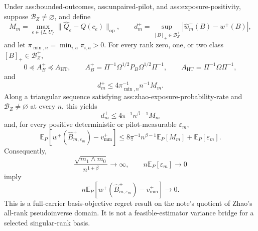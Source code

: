 Under ass:bounded-outcomes, ass:unpaired-pilot, and ass:exposure-positivity, suppose \(\mathcal B_Z\ne\varnothing\), and define
\[
 M_m=\max_{e\in\{L,U\}}\lVert\widehat Q_e-Q(c_e)\rVert_{\mathrm{op}},
 \qquad
 d_m^+=\sup_{[B]_+\in\mathcal B_Z^+}
 |\widehat w_m^+(B)-w^+(B)|,
\]
and let \(\pi_{\min,n}=\min_{i,a}\pi_{i,a}>0\).  For every rank zero, one, or two class \([B]_+\in\mathcal B_Z^+\),
\[
 0\preceq A_B^+\preceq A_{\mathrm{HT}},
 \qquad
 A_B^+=\Pi^{-1}\Omega^{1/2}P_B\Omega^{1/2}\Pi^{-1},
 \qquad
 A_{\mathrm{HT}}=\Pi^{-1}\Omega\Pi^{-1},
\]
and
\[
 d_m^+\le 4\pi_{\min,n}^{-1}n^{-1}M_m.
\]
Along a triangular sequence satisfying ass:zhao-exposure-probability-rate and \(\mathcal B_Z\ne\varnothing\) at every \(n\), this yields
\[
 d_m^+\le4\underline\pi^{-1}n^{\beta-1}M_m
\tag{A}
\]
and, for every positive deterministic or pilot-measurable \(\varepsilon_m\),
\[
 \mathbb E_P\!\left[
 w^+(\widehat B_{m,\varepsilon_m}^+)-v_{\mathrm{mm}}^+
 \right]
 \le
 8\underline\pi^{-1}n^{\beta-1}\mathbb E_P[M_m]
 +\mathbb E_P[\varepsilon_m].
\tag{B}
\]
Consequently,
\[
 \frac{\sqrt{m_1\wedge m_0}}{n^{1+\beta}}\longrightarrow\infty,
 \qquad n\mathbb E_P[\varepsilon_m]\longrightarrow0
\]
imply
\[
 n\mathbb E_P\!\left[
 w^+(\widehat B_{m,\varepsilon_m}^+)-v_{\mathrm{mm}}^+
 \right]\longrightarrow0.
\]
This is a full-carrier basis-objective regret result on the note's quotient of Zhao's all-rank pseudoinverse domain.  It is not a feasible-estimator variance bridge for a selected singular-rank basis.